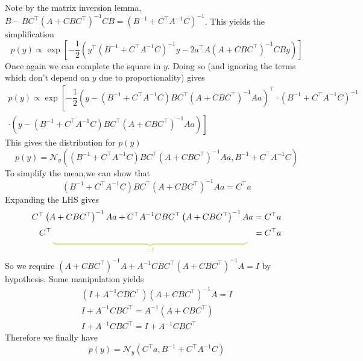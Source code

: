 \documentclass[11pt]{report} %
\begin{document}
Note by the matrix inversion lemma, $B - BC^{\top}\left(A+CBC^{\top}\right)^{-1}CB = \left(B^{-1} + C^{\top}A^{-1}C\right)^{-1}$. This yields the simplification
\begin{equation}
p\left(y\right) \propto \exp\left[-\dfrac{1}{2}\left(y^{\top}\left(B^{-1} + C^{\top}A^{-1}C\right)^{-1}y-2a^{\top}A\left(A+CBC^{\top}\right)^{-1}CBy\right)\right]
\end{equation}
Once again we can complete the square in $y$. Doing so (and ignoring the terms which don't depend on $y$ due to proportionality) gives
\begin{multline}
p\left(y\right) \propto \exp\left[-\dfrac{1}{2}\left(y - \left(B^{-1} + C^{\top}A^{-1}C\right)BC^{\top}\left(A+CBC^{\top}\right)^{-1}Aa\right)^{\top}\cdot\left(B^{-1} + C^{\top}A^{-1}C\right)^{-1} \right. \\
\left. \cdot\left(y - \left(B^{-1} + C^{\top}A^{-1}C\right)BC^{\top}\left(A+CBC^{\top}\right)^{-1}Aa\right)\right]
\end{multline}
This gives the distribution for $p\left(y\right)$
\begin{equation}
p\left(y\right) = \mathcal{N}_{y}\left(\left(B^{-1} + C^{\top}A^{-1}C\right)BC^{\top}\left(A+CBC^{\top}\right)^{-1}Aa, B^{-1} + C^{\top}A^{-1}C\right)
\end{equation}
To simplify the mean,we can show that
\begin{equation}
\left(B^{-1} + C^{\top}A^{-1}C\right)BC^{\top}\left(A+CBC^{\top}\right)^{-1}Aa = C^{\top}a
\end{equation}
Expanding the LHS gives
\begin{align}
C^{\top}\left(A+CBC^{\top}\right)^{-1}Aa + C^{\top}A^{-1}CBC^{\top}\left(A+CBC^{\top}\right)^{-1}Aa &= C^{\top}a \\
C^{\top}\green\underbrace{\black\left[\left(A+CBC^{\top}\right)^{-1}A + A^{-1}CBC^{\top}\left(A+CBC^{\top}\right)^{-1}A\right]}_{\green=I}\black a &= C^{\top}a
\end{align}
So we require $\left(A+CBC^{\top}\right)^{-1}A + A^{-1}CBC^{\top}\left(A+CBC^{\top}\right)^{-1}A = I$ by hypothesis. Some manipulation yields
\begin{gather}
\left(I + A^{-1}CBC^{\top}\right)\left(A+CBC^{\top}\right)^{-1}A = I \\
I + A^{-1}CBC^{\top} = A^{-1}\left(A+CBC^{\top}\right) \\
I + A^{-1}CBC^{\top} = I + A^{-1}CBC^{\top}
\end{gather}
Therefore we finally have
\begin{equation}
p\left(y\right) = \mathcal{N}_{y}\left(C^{\top}a, B^{-1} + C^{\top}A^{-1}C\right)
\end{equation}
\end{document}
